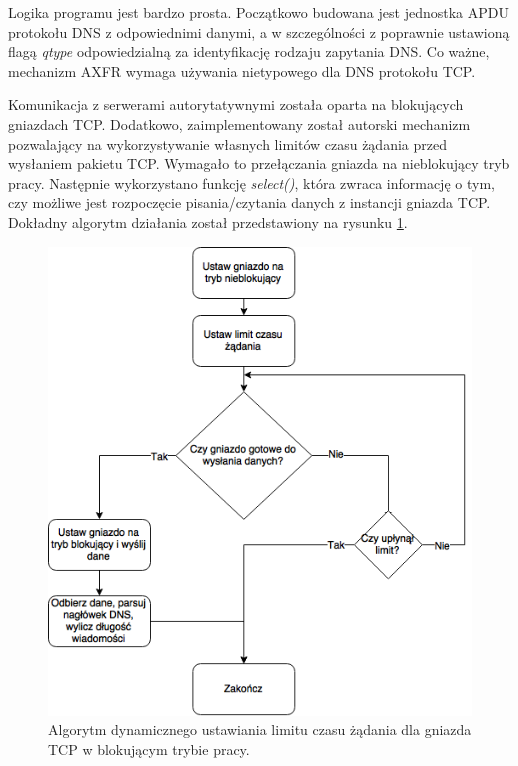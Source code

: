 Logika programu jest bardzo prosta. Początkowo budowana jest jednostka APDU protokołu DNS z odpowiednimi danymi, a w szczególności
z poprawnie ustawioną flagą \textit{qtype} odpowiedzialną za identyfikację rodzaju zapytania DNS. Co ważne, mechanizm AXFR wymaga
używania nietypowego dla DNS protokołu TCP.

Komunikacja z serwerami autorytatywnymi została oparta na blokujących gniazdach TCP. Dodatkowo, zaimplementowany został autorski
mechanizm pozwalający na wykorzystywanie własnych limitów czasu żądania przed wysłaniem pakietu TCP. Wymagało to przełączania
gniazda na nieblokujący tryb pracy. Następnie wykorzystano funkcję \textit{select()}, która zwraca informację o tym, czy możliwe jest
rozpoczęcie pisania/czytania danych z instancji gniazda TCP. Dokładny algorytm działania został przedstawiony na rysunku \ref{fig:socketAlg}.

\begin{figure}[ht]
	\centering
	\includegraphics[width=1.0\textwidth]{image/socketAlg}
	\caption{Algorytm dynamicznego ustawiania limitu czasu żądania dla gniazda TCP w blokującym trybie pracy.}
	\label{fig:socketAlg}
\end{figure}

